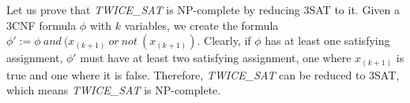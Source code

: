 
Let us prove that \textit{TWICE\_SAT} is NP-complete by reducing 3SAT to it.
Given a 3CNF formula $\phi$ with $k$ variables, we create the formula $\phi' := \phi\ and\ (x_{(k+1)}\ or \ not\ (x_{(k+1)})$.
Clearly, if $\phi$ has at least one satisfying assignment, $\phi'$ must have at least two satisfying assignment, one where $x_{(k+1)}$ is true and one where it is false.
Therefore, \textit{TWICE\_SAT} can be reduced to 3SAT, which means \textit{TWICE\_SAT} is NP-complete.